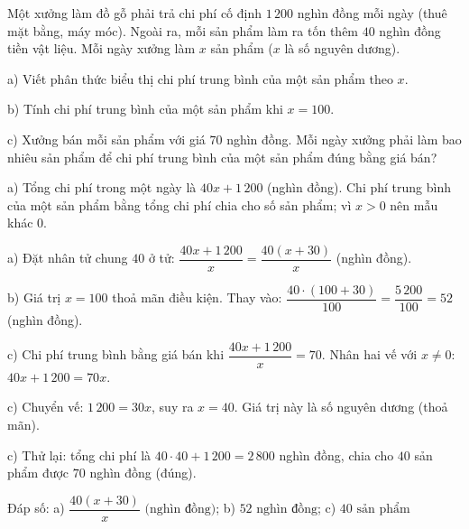 \begin{problem}[8DS-PS-044]
Một xưởng làm đồ gỗ phải trả chi phí cố định $1\,200$ nghìn đồng mỗi ngày (thuê mặt bằng, máy móc). Ngoài ra, mỗi sản phẩm làm ra tốn thêm $40$ nghìn đồng tiền vật liệu. Mỗi ngày xưởng làm $x$ sản phẩm ($x$ là số nguyên dương).

a) Viết phân thức biểu thị chi phí trung bình của một sản phẩm theo $x$.

b) Tính chi phí trung bình của một sản phẩm khi $x = 100$.

c) Xưởng bán mỗi sản phẩm với giá $70$ nghìn đồng. Mỗi ngày xưởng phải làm bao nhiêu sản phẩm để chi phí trung bình của một sản phẩm đúng bằng giá bán?

\begin{solution}
a) Tổng chi phí trong một ngày là $40x + 1\,200$ (nghìn đồng). Chi phí trung bình của một sản phẩm bằng tổng chi phí chia cho số sản phẩm; vì $x > 0$ nên mẫu khác $0$.

a) Đặt nhân tử chung $40$ ở tử: $\dfrac{40x + 1\,200}{x} = \dfrac{40(x + 30)}{x}$ (nghìn đồng).

b) Giá trị $x = 100$ thoả mãn điều kiện. Thay vào: $\dfrac{40 \cdot (100 + 30)}{100} = \dfrac{5\,200}{100} = 52$ (nghìn đồng).

c) Chi phí trung bình bằng giá bán khi $\dfrac{40x + 1\,200}{x} = 70$. Nhân hai vế với $x \neq 0$: $40x + 1\,200 = 70x$.

c) Chuyển vế: $1\,200 = 30x$, suy ra $x = 40$. Giá trị này là số nguyên dương (thoả mãn).

c) Thử lại: tổng chi phí là $40 \cdot 40 + 1\,200 = 2\,800$ nghìn đồng, chia cho $40$ sản phẩm được $70$ nghìn đồng (đúng).

Đáp số: a) $\boxed{\dfrac{40(x + 30)}{x} \text{ (nghìn đồng)}}$; b) $\boxed{52 \text{ nghìn đồng}}$; c) $\boxed{40 \text{ sản phẩm}}$
\end{solution}
\end{problem}


